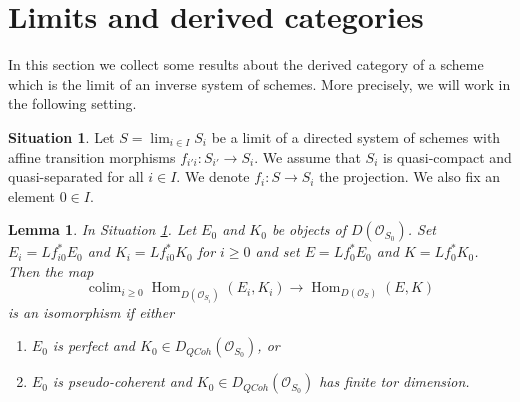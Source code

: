 \documentclass{stacks-project}
\theoremstyle{plain}
\newtheorem{lemma}[subsection]{Lemma}
\theoremstyle{definition}
\newtheorem{situation}[subsection]{Situation}
\theoremstyle{remark}
\numberwithin{equation}{subsection}
\def\lim{\mathop{\mathrm{lim}}\nolimits}
\def\colim{\mathop{\mathrm{colim}}\nolimits}
\def\Hom{\mathop{\mathrm{Hom}}\nolimits}
\def\QCoh{\mathit{QCoh}}
\begin{document}
\section{Limits and derived categories}
\label{section-limits}

\noindent
In this section we collect some results about the derived category
of a scheme which is the limit of an inverse system of schemes.
More precisely, we will work in the following setting.

\begin{situation}
\label{situation-descent}
Let $S = \lim_{i \in I} S_i$ be a limit of a directed system of schemes
with affine transition morphisms $f_{i'i} : S_{i'} \to S_i$.
We assume that $S_i$ is quasi-compact and quasi-separated for all $i \in I$.
We denote $f_i : S \to S_i$ the projection. We also fix an element $0 \in I$.
\end{situation}

\begin{lemma}
\label{lemma-descend-homomorphisms}
In Situation \ref{situation-descent}.
Let $E_0$ and $K_0$ be objects of
$D(\mathcal{O}_{S_0})$.
Set $E_i = Lf_{i0}^*E_0$ and $K_i = Lf_{i0}^*K_0$ for $i \geq 0$
and set $E = Lf_0^*E_0$ and $K = Lf_0^*K_0$. Then the map
$$
\colim_{i \geq 0} \Hom_{D(\mathcal{O}_{S_i})}(E_i, K_i)
\longrightarrow
\Hom_{D(\mathcal{O}_S)}(E, K)
$$
is an isomorphism if either
\begin{enumerate}
\item $E_0$ is perfect and $K_0 \in D_\QCoh(\mathcal{O}_{S_0})$, or
\item $E_0$ is pseudo-coherent and
$K_0 \in D_\QCoh(\mathcal{O}_{S_0})$ has finite tor dimension.
\end{enumerate}
\end{lemma}
\end{document}
